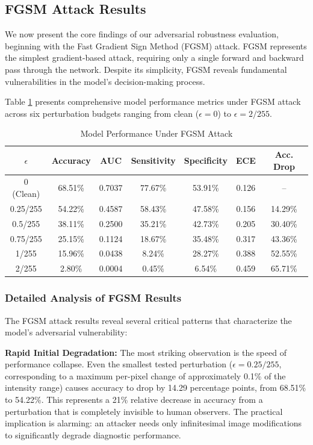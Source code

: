 \documentclass[12pt,a4paper]{article}
\begin{document}
\subsection{FGSM Attack Results}

We now present the core findings of our adversarial robustness evaluation, beginning with the Fast Gradient Sign Method (FGSM) attack. FGSM represents the simplest gradient-based attack, requiring only a single forward and backward pass through the network. Despite its simplicity, FGSM reveals fundamental vulnerabilities in the model's decision-making process.

Table \ref{tab:fgsm} presents comprehensive model performance metrics under FGSM attack across six perturbation budgets ranging from clean ($\epsilon=0$) to $\epsilon=2/255$.

\begin{table}[H]
\centering
    \caption{Model Performance Under FGSM Attack}
    \label{tab:fgsm}
\begin{tabular}{ccccccc}
\toprule
        \textbf{$\epsilon$} & \textbf{Accuracy} & \textbf{AUC} & \textbf{Sensitivity} & \textbf{Specificity} & \textbf{ECE} & \textbf{Acc. Drop} \\
\midrule
        0 (Clean) & 68.51\% & 0.7037 & 77.67\% & 53.91\% & 0.126 & -- \\
        0.25/255 & 54.22\% & 0.4587 & 58.43\% & 47.58\% & 0.156 & 14.29\% \\
        0.5/255 & 38.11\% & 0.2500 & 35.21\% & 42.73\% & 0.205 & 30.40\% \\
        0.75/255 & 25.15\% & 0.1124 & 18.67\% & 35.48\% & 0.317 & 43.36\% \\
        1/255 & 15.96\% & 0.0438 & 8.24\% & 28.27\% & 0.388 & 52.55\% \\
        2/255 & 2.80\% & 0.0004 & 0.45\% & 6.54\% & 0.459 & 65.71\% \\
\bottomrule
\end{tabular}
\end{table}

\subsubsection{Detailed Analysis of FGSM Results}

The FGSM attack results reveal several critical patterns that characterize the model's adversarial vulnerability:

\textbf{Rapid Initial Degradation:} The most striking observation is the speed of performance collapse. Even the smallest tested perturbation ($\epsilon=0.25/255$, corresponding to a maximum per-pixel change of approximately 0.1\% of the intensity range) causes accuracy to drop by 14.29 percentage points, from 68.51\% to 54.22\%. This represents a 21\% relative decrease in accuracy from a perturbation that is completely invisible to human observers. The practical implication is alarming: an attacker needs only infinitesimal image modifications to significantly degrade diagnostic performance.
\end{document}

